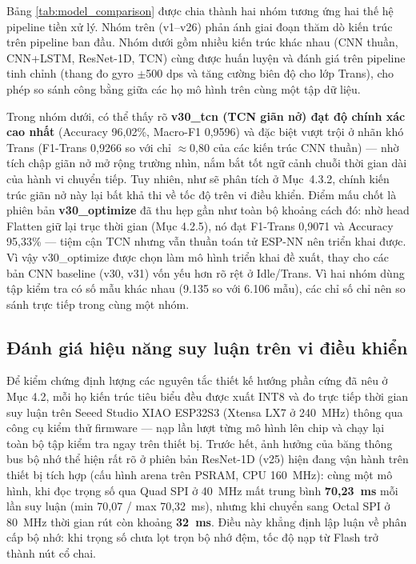 \documentclass[../DoAn.tex]{subfiles}
\begin{document}
Bảng \ref{tab:model_comparison} được chia thành hai nhóm tương ứng hai thế hệ pipeline tiền xử lý. Nhóm trên (v1--v26) phản ánh giai đoạn thăm dò kiến trúc trên pipeline ban đầu. Nhóm dưới gồm nhiều kiến trúc khác nhau (CNN thuần, CNN+LSTM, ResNet-1D, TCN) cùng được huấn luyện và đánh giá trên pipeline tinh chỉnh (thang đo gyro $\pm$500 dps và tăng cường biên độ cho lớp Trans), cho phép so sánh công bằng giữa các họ mô hình trên cùng một tập dữ liệu.

Trong nhóm dưới, có thể thấy rõ \textbf{v30\_tcn (TCN giãn nở) đạt độ chính xác cao nhất} (Accuracy 96,02\%, Macro-F1 0,9596) và đặc biệt vượt trội ở nhãn khó Trans (F1-Trans 0,9266 so với chỉ $\approx$0,80 của các kiến trúc CNN thuần) --- nhờ tích chập giãn nở mở rộng trường nhìn, nắm bắt tốt ngữ cảnh chuỗi thời gian dài của hành vi chuyển tiếp. Tuy nhiên, như sẽ phân tích ở Mục~4.3.2, chính kiến trúc giãn nở này lại bất khả thi về tốc độ trên vi điều khiển. Điểm mấu chốt là phiên bản \textbf{v30\_optimize} đã thu hẹp gần như toàn bộ khoảng cách đó: nhờ head Flatten giữ lại trục thời gian (Mục 4.2.5), nó đạt F1-Trans 0,9071 và Accuracy 95,33\% --- tiệm cận TCN nhưng vẫn thuần toán tử ESP-NN nên triển khai được. Vì vậy v30\_optimize được chọn làm mô hình triển khai đề xuất, thay cho các bản CNN baseline (v30, v31) vốn yếu hơn rõ rệt ở Idle/Trans. Vì hai nhóm dùng tập kiểm tra có số mẫu khác nhau (9.135 so với 6.106 mẫu), các chỉ số chỉ nên so sánh trực tiếp trong cùng một nhóm.

\subsection{Đánh giá hiệu năng suy luận trên vi điều khiển}

Để kiểm chứng định lượng các nguyên tắc thiết kế hướng phần cứng đã nêu ở Mục 4.2, mỗi họ kiến trúc tiêu biểu đều được xuất INT8 và đo trực tiếp thời gian suy luận trên Seeed Studio XIAO ESP32S3 (Xtensa LX7 ở 240~MHz) thông qua công cụ kiểm thử firmware --- nạp lần lượt từng mô hình lên chip và chạy lại toàn bộ tập kiểm tra ngay trên thiết bị. Trước hết, ảnh hưởng của băng thông bus bộ nhớ thể hiện rất rõ ở phiên bản ResNet-1D (v25) hiện đang vận hành trên thiết bị tích hợp (cấu hình arena trên PSRAM, CPU 160~MHz): cùng một mô hình, khi đọc trọng số qua Quad SPI ở 40~MHz mất trung bình \textbf{70,23~ms} mỗi lần suy luận (min 70,07 / max 70,32~ms), nhưng khi chuyển sang Octal SPI ở 80~MHz thời gian rút còn khoảng \textbf{32~ms}. Điều này khẳng định lập luận về phân cấp bộ nhớ: khi trọng số chưa lọt trọn bộ nhớ đệm, tốc độ nạp từ Flash trở thành nút cổ chai.
\end{document}
